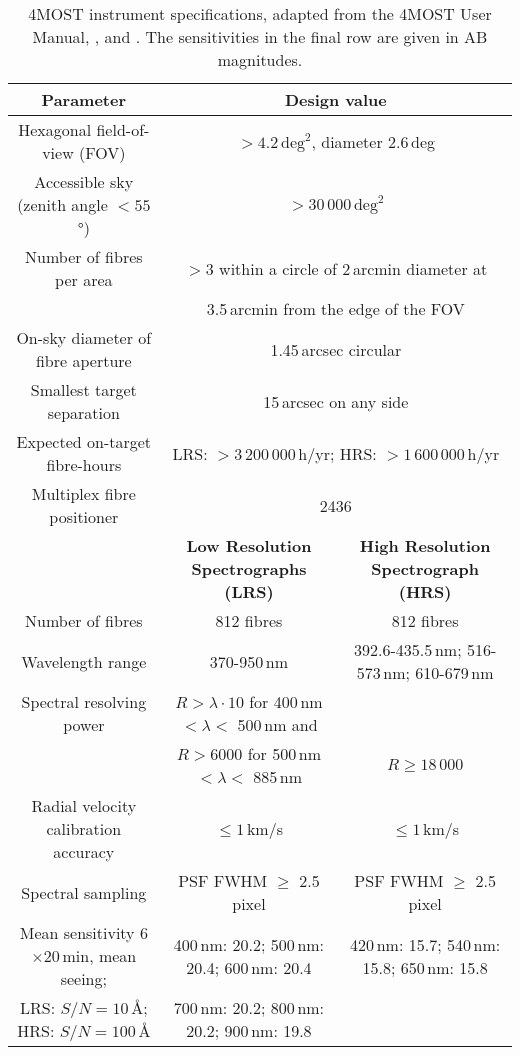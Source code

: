 \documentclass[a4paper,11pt]{article}
\begin{document}
\begin{table}
\centering\footnotesize
\caption[4MOST instrument specifications]{4MOST instrument specifications, adapted from the 4MOST User Manual\footnotemark, \citet{4mostgen}, and \citet{4most16}. The sensitivities in the final row are given in AB magnitudes.}
\label{tab:4most_specs}
\begin{tabular}{|c||c|c|}
 \hline
 \bf{Parameter} & \multicolumn{2}{|c|}{\bf{Design value}} \\
 \hline\hline
 Hexagonal field-of-view (FOV) & \multicolumn{2}{|c|}{${>}4.2\,\mathrm{deg}^2$, diameter 2.6\,deg} \\
 \hline
 Accessible sky (zenith angle ${<}55$°) & \multicolumn{2}{|c|}{${>}30\,000\,\mathrm{deg}^2$} \\
 \hline
 Number of fibres per area & \multicolumn{2}{|c|}{${>}3$ within a circle of 2\,arcmin diameter at} \\
  & \multicolumn{2}{|c|}{3.5\,arcmin from the edge of the FOV} \\
 \hline
 On-sky diameter of fibre aperture & \multicolumn{2}{|c|}{1.45\,arcsec circular} \\
 \hline
 Smallest target separation & \multicolumn{2}{|c|}{15\,arcsec on any side} \\
 \hline
 Expected on-target fibre-hours & \multicolumn{2}{|c|}{LRS: ${>}3\,200\,000$\,h/yr; HRS: ${>}1\,600\,000$\,h/yr} \\
 \hline
 Multiplex fibre positioner & \multicolumn{2}{|c|}{2436} \\
 \hline\hline
  & \bf{Low Resolution Spectrographs (LRS)} & \bf{High Resolution Spectrograph (HRS)} \\
 \hline\hline
 Number of fibres & 812 fibres & 812 fibres \\
 \hline
 Wavelength range & 370-950\,nm & 392.6-435.5\,nm; 516-573\,nm; 610-679\,nm \\
 \hline
 Spectral resolving power & $R>\lambda\cdot10$ for 400\,nm $<\lambda<$ 500\,nm and & \\
  & $R>6000$ for 500\,nm $<\lambda<$ 885\,nm & $R\geq18\,000$ \\
  \hline
  Radial velocity calibration accuracy & ${\leq}1$\,km/s & ${\leq}1$\,km/s \\
  \hline
  Spectral sampling & PSF FWHM $\geq$ 2.5 pixel & PSF FWHM $\geq$ 2.5 pixel \\
 \hline
 Mean sensitivity 6$\times$20\,min, mean seeing; & 400\,nm: 20.2; 500\,nm: 20.4; 600\,nm: 20.4 & 420\,nm: 15.7; 540\,nm: 15.8; 650\,nm: 15.8 \\
 LRS: $S/N=10$\,\r{A}; HRS: $S/N=100$\,\r{A} & 700\,nm: 20.2; 800\,nm: 20.2; 900\,nm: 19.8 & \\
 \hline
\end{tabular}
\end{table}
\end{document}
